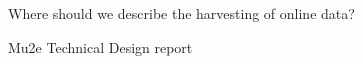 \documentclass{webofc}
\begin{document}
%

%
\maketitle

















Where should we describe the harvesting of online data?

\appendix


%
% 
%
%
\begin{thebibliography}{}
%
%
 Mu2e Technical Design report
\end{thebibliography}
\end{document}
